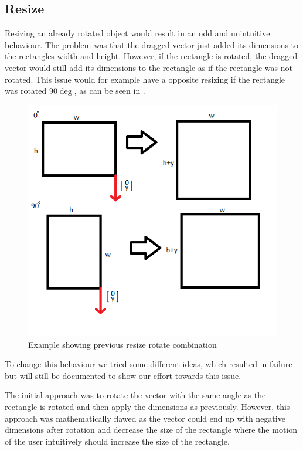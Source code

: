 \subsection{Resize}
Resizing an already rotated object would result in an odd and unintuitive behaviour.
The problem was that the dragged vector just added its dimensions to the rectangles width and height.
However, if the rectangle is rotated, the dragged vector would still add its dimensions to the rectangle as if the rectangle was not rotated.
This issue would for example have a opposite resizing if the rectangle was rotated $90\deg$, as can be seen in .
\begin{figure}
\includegraphics[scale=0.5]{media/How-Rotate+Resize-Worked}
\caption{Example showing previous resize rotate combination}
\label{fig:resizeRotate}
\end{figure}
To change this behaviour we tried some different ideas, which resulted in failure but will still be documented to show our effort towards this issue. 

The initial approach was to rotate the vector with the same angle as the rectangle is rotated and then apply the dimensions as previously.
However, this approach was mathematically flawed as the vector could end up with negative dimensions after rotation and decrease the size of the rectangle where the motion of the user intuitively should increase the size of the rectangle.

